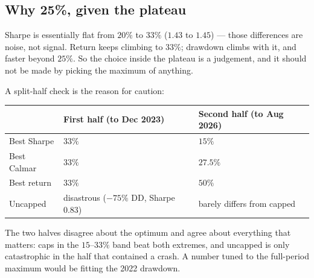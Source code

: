 \documentclass[11pt,a4paper]{article}
\begin{document}
\subsection{Why 25\%, given the plateau}

Sharpe is essentially flat from $20\%$ to $33\%$ ($1.43$ to $1.45$) ---
those differences are noise, not signal. Return keeps climbing to
$33\%$; drawdown climbs with it, and faster beyond $25\%$. So the choice
inside the plateau is a judgement, and it should not be made by picking
the maximum of anything.

\vspace{0.5em}
A split-half check is the reason for caution:

\vspace{0.5em}
\centering
\begin{tabular}{@{}lll@{}}
    \toprule
    & \textbf{First half (to Dec 2023)} & \textbf{Second half (to Aug 2026)} \\
    \midrule
    Best Sharpe & $33\%$ & $15\%$ \\
    Best Calmar & $33\%$ & $27.5\%$ \\
    Best return & $33\%$ & $50\%$ \\
    Uncapped    & disastrous ($-75\%$ DD, Sharpe $0.83$) & barely differs from capped \\
    \bottomrule
\end{tabular}

\raggedright
\vspace{0.8em}

The two halves disagree about the optimum and agree about everything
that matters: caps in the $15$--$33\%$ band beat both extremes, and
uncapped is only catastrophic in the half that contained a crash. A
number tuned to the full-period maximum would be fitting the 2022
drawdown.
\end{document}
